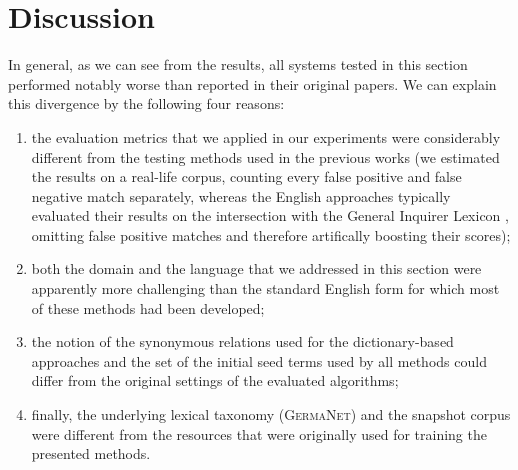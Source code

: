 \section{Discussion}

In general, as we can see from the results, all systems tested in this
section performed notably worse than reported in their original
papers.  We can explain this divergence by the following four reasons:
\begin{enumerate}[1\upshape)]
\item the evaluation metrics that we applied in our experiments were
  considerably different from the testing methods used in the previous
  works (we estimated the results on a real-life corpus, counting
  every false positive and false negative match separately, whereas
  the English approaches typically evaluated their results on the
  intersection with the General Inquirer Lexicon \cite{Stone:66},
  omitting false positive matches and therefore artifically boosting
  their scores);
\item both the domain and the language that we addressed in this
  section were apparently more challenging than the standard English
  form for which most of these methods had been developed;
\item the notion of the synonymous relations used for the
  dictionary-based approaches and the set of the initial seed terms
  used by all methods could differ from the original settings of the
  evaluated algorithms;
\item finally, the underlying lexical taxonomy (\textsc{GermaNet}) and
  the snapshot corpus were different from the resources that were
  originally used for training the presented methods.
\end{enumerate}




